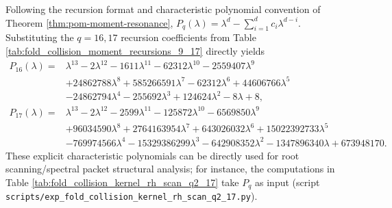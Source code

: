\begin{remark}\label{rem:pom-moment-charpoly-16-17}
Following the recursion format and characteristic polynomial convention of Theorem \ref{thm:pom-moment-resonance},
\(
P_q(\lambda)=\lambda^d-\sum_{i=1}^d c_i\lambda^{d-i}
\).
Substituting the \(q=16,17\) recursion coefficients from Table \ref{tab:fold_collision_moment_recursions_9_17} directly yields
$$
\begin{aligned}
P_{16}(\lambda)={}&\lambda^{13}-2\lambda^{12}-1611\lambda^{11}-62312\lambda^{10}-2559407\lambda^9\\
&+24862788\lambda^8+585266591\lambda^7-62312\lambda^6+44606766\lambda^5\\
&-24862794\lambda^4-255692\lambda^3+124624\lambda^2-8\lambda+8,
\\
P_{17}(\lambda)={}&\lambda^{13}-2\lambda^{12}-2599\lambda^{11}-125872\lambda^{10}-6569850\lambda^9\\
&+96034590\lambda^8+2764163954\lambda^7+643026032\lambda^6+15022392733\lambda^5\\
&-769974566\lambda^4-15329386299\lambda^3-642908352\lambda^2-1347896340\lambda+673948170.
\end{aligned}
$$
These explicit characteristic polynomials can be directly used for root scanning/spectral packet structural analysis; for instance, the computations in Table \ref{tab:fold_collision_kernel_rh_scan_q2_17} take \(P_q\) as input (script \texttt{scripts/exp\_fold\_collision\_kernel\_rh\_scan\_q2\_17.py}).
\end{remark}

